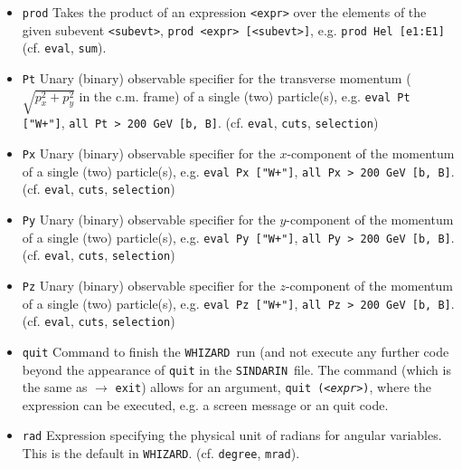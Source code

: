 \documentclass[12pt]{book}
\newcommand{\ttt}[1]{\texttt{#1}}
\newcommand{\whizard}{\ttt{WHIZARD}}
\newcommand{\oMega}{\ttt{O'Mega}}
\newcommand{\sindarin}{\ttt{SINDARIN}}
\begin{document}
\begin{itemize}
the matrix element(s): \ttt{\$method}, possible methods are either
with the \oMega\ matrix element generator, using template matrix
elements with different normalizations, or completely internal matrix
element; for \oMega\ matrix elements there is also the possibility to
specify possible restrictions (cf. \ttt{\$restrictions}).
\item
\ttt{prod} \newline
Takes the product of an expression \ttt{<expr>} over the elements of
the given subevent \ttt{<subevt>}, \ttt{prod <expr> [<subevt>]}, e.g.
\ttt{prod Hel [e1:E1]} (cf. \ttt{eval}, \ttt{sum}).
\item
\ttt{Pt} \newline
Unary (binary) observable specifier for the transverse momentum
($\sqrt{p_x^2 + p_y^2}$ in the c.m. frame) of a single (two)
particle(s), e.g. \ttt{eval Pt ["W+"]}, \ttt{all Pt > 200 GeV [b,
B]}. (cf. \ttt{eval}, \ttt{cuts}, \ttt{selection})
\item
\ttt{Px} \newline
Unary (binary) observable specifier for the $x$-component of the
momentum of a single (two) particle(s), e.g. \ttt{eval Px ["W+"]},
\ttt{all Px > 200 GeV [b, B]}. (cf. \ttt{eval}, \ttt{cuts},
\ttt{selection})
\item
\ttt{Py} \newline
Unary (binary) observable specifier for the $y$-component of the
momentum of a single (two) particle(s), e.g. \ttt{eval Py ["W+"]},
\ttt{all Py > 200 GeV [b, B]}. (cf. \ttt{eval}, \ttt{cuts},
\ttt{selection})
\item
\ttt{Pz} \newline
Unary (binary) observable specifier for the $z$-component of the
momentum of a single (two) particle(s), e.g. \ttt{eval Pz ["W+"]},
\ttt{all Pz > 200 GeV [b, B]}. (cf. \ttt{eval}, \ttt{cuts},
\ttt{selection})
\item
\ttt{quit} \newline
Command to finish the \whizard\ run (and not execute any further code
beyond the appearance of \ttt{quit} in the \sindarin\ file. The command
(which is the same as $\to$ \ttt{exit}) allows for an argument,
\ttt{quit ({\em <expr>})}, where the expression can be executed, e.g. a
screen message or an quit code.
\item
\ttt{rad} \newline
Expression specifying the physical unit of radians for angular
variables. This is the default in \whizard. (cf. \ttt{degree}, \ttt{mrad}).

\end{itemize}
\end{document}
